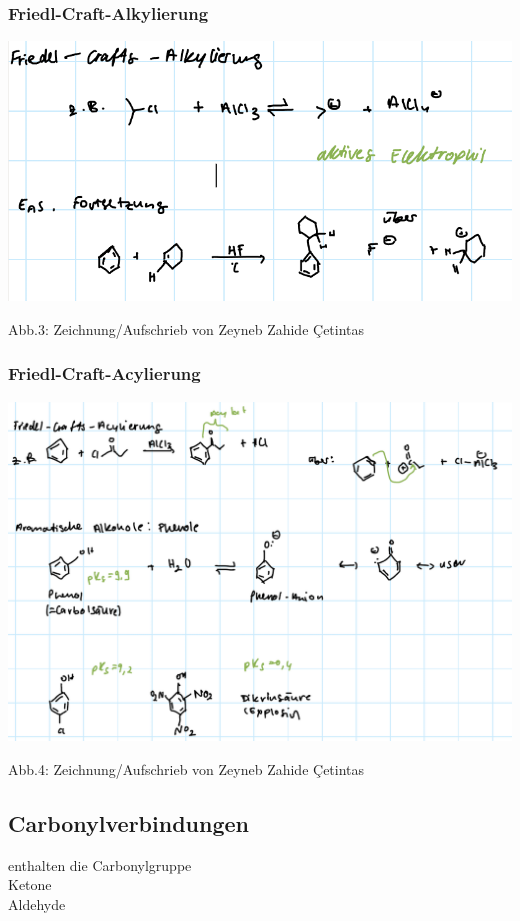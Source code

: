 \documentclass[a4paper, fleqn]{article}
\def\Cc{Ç}
\begin{document}
\subsubsection{Friedl-Craft-Alkylierung}
\includegraphics[width=0.9\pdfpagewidth]{hjrty.PNG}
\begin{center}
  Abb.3: Zeichnung/Aufschrieb von Zeyneb Zahide \Cc etintas
\end{center}
\subsubsection{Friedl-Craft-Acylierung}
\includegraphics[width=0.9\pdfpagewidth]{klinka.PNG}
\begin{center}
  Abb.4: Zeichnung/Aufschrieb von Zeyneb Zahide \Cc etintas
\end{center}
\subsection{Carbonylverbindungen}
enthalten die Carbonylgruppe\\
 Ketone\\
 Aldehyde\\
\end{document}
